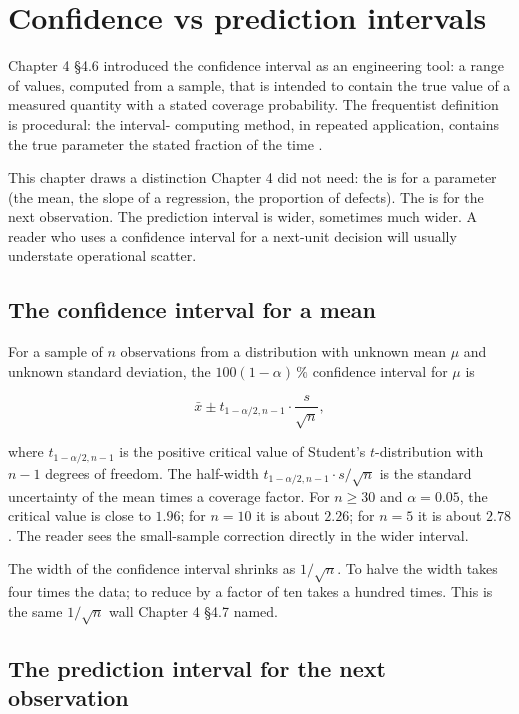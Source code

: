 \section{Confidence vs prediction intervals}

Chapter 4 §4.6 introduced the confidence interval as an engineering
tool: a range of values, computed from a sample, that is intended to
contain the true value of a measured quantity with a stated coverage
probability. The frequentist definition is procedural: the interval-
computing method, in repeated application, contains the true
parameter the stated fraction of the time
\cite[ch.~6]{text:wasserman2004}.

This chapter draws a distinction Chapter 4 did not need: the
 is for a parameter (the mean, the
slope of a regression, the proportion of defects). The
 is for the next observation. The
prediction interval is wider, sometimes much wider. A reader who
uses a confidence interval for a next-unit decision will usually
understate operational scatter.

\subsection{The confidence interval for a mean}

For a sample of $n$ observations from a distribution with unknown
mean $\mu$ and unknown standard deviation, the $100(1 - \alpha) \,\%$
confidence interval for $\mu$ is

\[
\bar{x} \pm t_{1-\alpha/2, n-1} \cdot \frac{s}{\sqrt{n}},
\]

where $t_{1-\alpha/2, n-1}$ is the positive critical value of
Student's $t$-distribution with $n - 1$ degrees of freedom. The
half-width $t_{1-\alpha/2, n-1} \cdot s/\sqrt{n}$ is the standard uncertainty of
the mean times a coverage factor. For $n \geq 30$ and $\alpha =
0.05$, the critical value is close to $1.96$; for $n = 10$ it is
about $2.26$; for $n = 5$ it is about $2.78$. The reader sees the
small-sample correction directly in the wider interval.

The width of the confidence interval shrinks as $1/\sqrt{n}$. To
halve the width takes four times the data; to reduce by a factor of
ten takes a hundred times. This is the same $1/\sqrt{n}$ wall
Chapter 4 §4.7 named.

\subsection{The prediction interval for the next observation}

